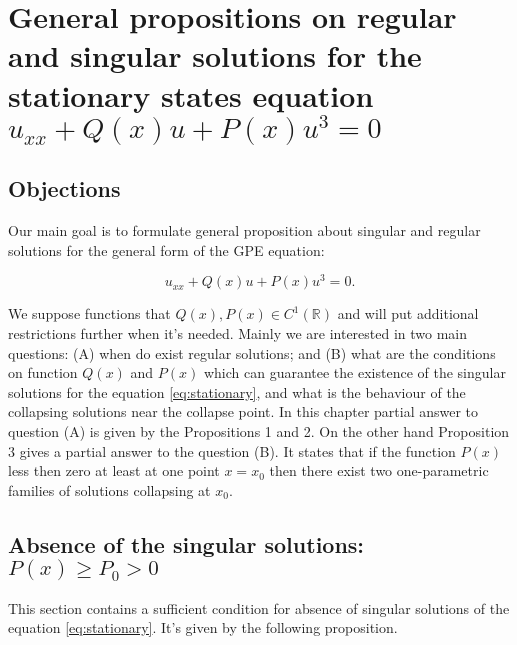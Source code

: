 \chapter{General propositions on regular and singular solutions for the stationary states equation $u_{xx} + Q(x) u + P(x) u^3 = 0$}

\section{Objections}

Our main goal is to formulate general proposition about singular  and regular solutions for the general form of the GPE equation:

\begin{equation}
	u_{xx} + Q(x) u + P(x) u^3 = 0.
	\label{eq:stationary}
\end{equation}

We suppose functions that $Q(x), P(x) \in C^1(\mathbb{R})$ and will put additional restrictions further when it's needed.
Mainly we are interested in two main questions: (A) when do exist regular solutions; and (B) what are the conditions on function $Q(x)$ and $P(x)$ which can guarantee the existence of the singular solutions for the equation \eqref{eq:stationary}, and what is the behaviour of the collapsing solutions near the collapse point.
In this chapter partial answer to question (A) is given by the Propositions 1 and 2.
On the other hand Proposition 3 gives a partial answer to the question (B).
It states that if the function $P(x)$ less then zero at least at one point $x = x_0$ then there exist two one-parametric families of solutions collapsing at $x_0$.

\section{Absence of the singular solutions: $P(x) \ge P_0 > 0$}

This section contains a sufficient condition for absence of singular solutions of the equation \eqref{eq:stationary}.
It's given by the following proposition.

